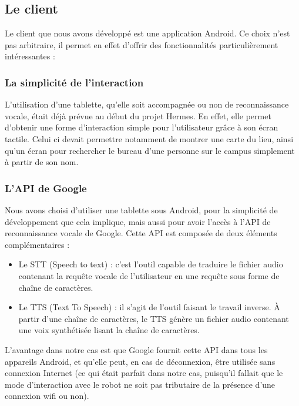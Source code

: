 \documentclass{report}
\begin{document}
      \subsection{Le client}
      {Le client que nous avons développé est une application Android. Ce choix n'est
      pas arbitraire, il permet en effet d'offrir des fonctionnalités particulièrement
      intéressantes :}

        \subsubsection{La simplicité de l'interaction}
        {L'utilisation d'une tablette, qu'elle soit accompagnée ou non de reconnaissance
        vocale, était déjà prévue au début du projet Hermes. En effet, elle permet
        d'obtenir une forme d'interaction simple pour l'utilisateur grâce à son écran tactile.
        Celui ci devait permettre notamment de montrer une carte du lieu, ainsi qu'un écran
        pour rechercher le bureau d'une personne sur le campus simplement à partir de son
        nom.}

        \subsubsection{L'API de Google}
        {Nous avons choisi d'utiliser une tablette sous Android, pour la simplicité de
        développement que cela implique, mais aussi pour avoir l'accès à l'API de reconnaissance
        vocale de Google. Cette API est composée de deux éléments complémentaires :}
        \begin{itemize}
          \item Le STT (Speech to text) : c'est l'outil capable de traduire le fichier
          audio contenant la requête vocale de l'utilisateur en une requête sous forme de
          chaîne de caractères.
          \item Le TTS (Text To Speech) : il s'agit de l'outil faisant le travail inverse.
          À partir d'une chaîne de caractères, le TTS génère un fichier audio contenant une
          voix synthétisée lisant la chaîne de caractères.
        \end{itemize}

        {L'avantage dans notre cas est que Google fournit cette API dans tous les appareils
        Android, et qu'elle peut, en cas de déconnexion, être utilisée sans connexion Internet
         (ce qui était parfait dans notre cas, puisqu'il fallait que le mode d'interaction
         avec le robot ne soit pas tributaire de la présence d'une connexion wifi ou non).}
\end{document}
